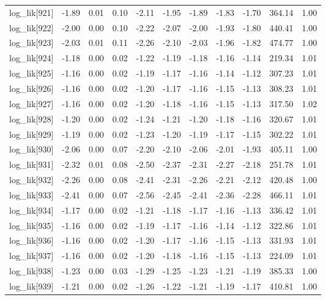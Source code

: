 \begin{table}[ht]
\begin{tabular}{rrrrrrrrrrr}
  log\_lik[921] & -1.89 & 0.01 & 0.10 & -2.11 & -1.95 & -1.89 & -1.83 & -1.70 & 364.14 & 1.00 \\ 
  log\_lik[922] & -2.00 & 0.00 & 0.10 & -2.22 & -2.07 & -2.00 & -1.93 & -1.80 & 440.41 & 1.00 \\ 
  log\_lik[923] & -2.03 & 0.01 & 0.11 & -2.26 & -2.10 & -2.03 & -1.96 & -1.82 & 474.77 & 1.00 \\ 
  log\_lik[924] & -1.18 & 0.00 & 0.02 & -1.22 & -1.19 & -1.18 & -1.16 & -1.14 & 219.34 & 1.01 \\ 
  log\_lik[925] & -1.16 & 0.00 & 0.02 & -1.19 & -1.17 & -1.16 & -1.14 & -1.12 & 307.23 & 1.01 \\ 
  log\_lik[926] & -1.16 & 0.00 & 0.02 & -1.20 & -1.17 & -1.16 & -1.15 & -1.13 & 308.23 & 1.01 \\ 
  log\_lik[927] & -1.16 & 0.00 & 0.02 & -1.20 & -1.18 & -1.16 & -1.15 & -1.13 & 317.50 & 1.02 \\ 
  log\_lik[928] & -1.20 & 0.00 & 0.02 & -1.24 & -1.21 & -1.20 & -1.18 & -1.16 & 320.67 & 1.01 \\ 
  log\_lik[929] & -1.19 & 0.00 & 0.02 & -1.23 & -1.20 & -1.19 & -1.17 & -1.15 & 302.22 & 1.01 \\ 
  log\_lik[930] & -2.06 & 0.00 & 0.07 & -2.20 & -2.10 & -2.06 & -2.01 & -1.93 & 405.11 & 1.00 \\ 
  log\_lik[931] & -2.32 & 0.01 & 0.08 & -2.50 & -2.37 & -2.31 & -2.27 & -2.18 & 251.78 & 1.01 \\ 
  log\_lik[932] & -2.26 & 0.00 & 0.08 & -2.41 & -2.31 & -2.26 & -2.21 & -2.12 & 420.48 & 1.00 \\ 
  log\_lik[933] & -2.41 & 0.00 & 0.07 & -2.56 & -2.45 & -2.41 & -2.36 & -2.28 & 466.11 & 1.01 \\ 
  log\_lik[934] & -1.17 & 0.00 & 0.02 & -1.21 & -1.18 & -1.17 & -1.16 & -1.13 & 336.42 & 1.01 \\ 
  log\_lik[935] & -1.16 & 0.00 & 0.02 & -1.19 & -1.17 & -1.16 & -1.14 & -1.12 & 322.86 & 1.01 \\ 
  log\_lik[936] & -1.16 & 0.00 & 0.02 & -1.20 & -1.17 & -1.16 & -1.15 & -1.13 & 331.93 & 1.01 \\ 
  log\_lik[937] & -1.16 & 0.00 & 0.02 & -1.20 & -1.18 & -1.16 & -1.15 & -1.13 & 224.09 & 1.01 \\ 
  log\_lik[938] & -1.23 & 0.00 & 0.03 & -1.29 & -1.25 & -1.23 & -1.21 & -1.19 & 385.33 & 1.00 \\ 
  log\_lik[939] & -1.21 & 0.00 & 0.02 & -1.26 & -1.22 & -1.21 & -1.19 & -1.17 & 410.81 & 1.00 \\ 

\end{tabular}
\end{table}
